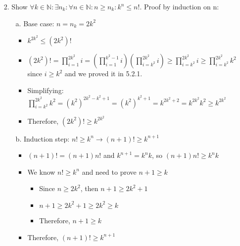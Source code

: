 \documentclass[12pt]{article}
\begin{document}
\begin{enumerate}
  \item[2.] Show ${\forall k \in \mathbb{N} : \exists n_k : \forall n \in \mathbb{N} : n \geq n_k : k^n \leq n!}$. Proof by induction on n:
    \begin{enumerate}
      \item[a.] Base case: ${n = n_k = 2k^2}$
        \begin{itemize}
          \item ${k^{2k^2} \leq (2k^2)!}$
          \item ${(2k^2)! = \prod_{i=1}^{2k^2} i = (\prod_{i=1}^{k^2-1} i)(\prod_{i=k^2}^{2k^2} i) \geq \prod_{i=k^2}^{2k^2} i \geq \prod_{i=k^2}^{2k^2} k^2}$ since ${i \geq k^2}$ and we proved it in 5.2.1.
          \item Simplifying: ${\prod_{i=k^2}^{2k^2} k^2 = (k^2)^{2k^2 - k^2 + 1} = (k^2)^{k^2+1} = k^{2k^2 + 2} = k^{2k^2} k^2 \geq k^{2k^2}}$
          \item Therefore, ${(2k^2)! \geq k^{2k^2}}$
        \end{itemize}
      \item[b.] Induction step: ${n! \geq k^n \rightarrow (n+1)! \geq k^{n+1}}$
        \begin{itemize}
          \item ${(n+1)! = (n+1)n!}$ and ${k^{n+1} = k^n k}$, so ${(n+1)n! \geq k^n k}$
          \item We know ${n! \geq k^n}$ and need to prove ${n+1 \geq k}$
            \begin{itemize}
              \item Since ${n \geq 2k^2}$, then ${n+1 \geq 2k^2 + 1}$
              \item ${n+1 \geq 2k^2 + 1 \geq 2k^2 \geq k}$
              \item Therefore, ${n+1 \geq k}$
            \end{itemize}
          \item Therefore, ${(n+1)! \geq k^{n+1}}$
        \end{itemize}
    \end{enumerate}
\end{enumerate}
\end{document}
